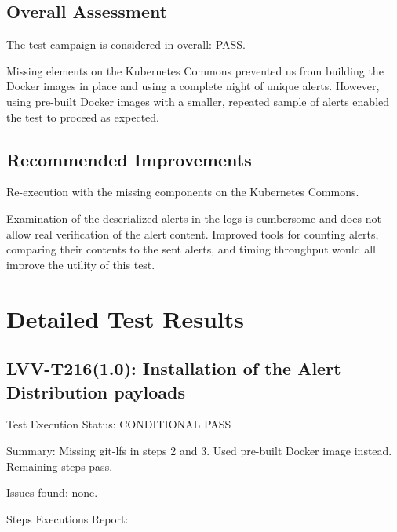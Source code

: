 \documentclass[DM,lsstdraft,STR,toc]{lsstdoc}
\begin{document}
\subsection{Overall Assessment}
\label{sect:overallassessment}

The test campaign is considered in overall: PASS.

Missing elements on the Kubernetes Commons prevented us from building the Docker images in place and using a complete night of unique alerts.
However, using pre-built Docker images with a smaller, repeated sample of alerts enabled the test to proceed as expected.


\subsection{Recommended Improvements}
\label{sect:recommendations}

Re-execution with the missing components on the Kubernetes Commons.

Examination of the deserialized alerts in the logs is cumbersome and does not allow real verification of the alert content. 
Improved tools for counting alerts, comparing their contents to the sent alerts, and timing throughput would all improve the utility of this test.




\newpage

\section{Detailed Test Results}
\label{sect:detailed}


\subsection{LVV-T216(1.0): Installation of the Alert Distribution payloads}
\label{sect:detail-lvv-t216}

Test Execution Status: CONDITIONAL PASS

Summary: Missing git-lfs in steps 2 and 3. Used pre-built Docker image instead. Remaining steps pass.

Issues found: none.

Steps Executions Report:
\end{document}
